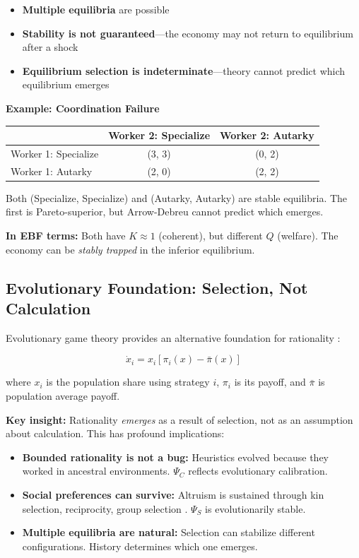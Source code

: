 \begin{itemize}
\item \textbf{Multiple equilibria} are possible
\item \textbf{Stability is not guaranteed}---the economy may not return to equilibrium after a shock
\item \textbf{Equilibrium selection is indeterminate}---theory cannot predict which equilibrium emerges
\end{itemize}

\textbf{Example: Coordination Failure}
\begin{center}
\renewcommand{\arraystretch}{1.2}
\begin{tabular}{l|cc}
 & Worker 2: Specialize & Worker 2: Autarky \\
\hline
Worker 1: Specialize & (3, 3) & (0, 2) \\
Worker 1: Autarky & (2, 0) & (2, 2) \\
\end{tabular}
\end{center}

Both (Specialize, Specialize) and (Autarky, Autarky) are stable equilibria.
The first is Pareto-superior, but Arrow-Debreu cannot predict which emerges.

\textbf{In EBF terms:} Both have $K \approx 1$ (coherent), but different $Q$ (welfare).
The economy can be \textit{stably trapped} in the inferior equilibrium.

\subsection{Evolutionary Foundation: Selection, Not Calculation}

Evolutionary game theory provides an alternative foundation for rationality
\citep{weibull1995, maynardsmith1982}:

\begin{equation}
\boxed{
\dot{x}_i = x_i \left[ \pi_i(x) - \bar{\pi}(x) \right]
}
\label{eq:mp-replicator}
\end{equation}

where $x_i$ is the population share using strategy $i$, $\pi_i$ is its payoff,
and $\bar{\pi}$ is population average payoff.

\textbf{Key insight:} Rationality \textit{emerges} as a result of selection, not as
an assumption about calculation. This has profound implications:

\begin{itemize}
\item \textbf{Bounded rationality is not a bug:} Heuristics evolved because they worked
      in ancestral environments. $\Psi_C$ reflects evolutionary calibration.
\item \textbf{Social preferences can survive:} Altruism is sustained through kin selection,
      reciprocity, group selection \citep{fehr2004nature}. $\Psi_S$ is evolutionarily stable.
\item \textbf{Multiple equilibria are natural:} Selection can stabilize different configurations.
      History determines which one emerges.
\end{itemize}

